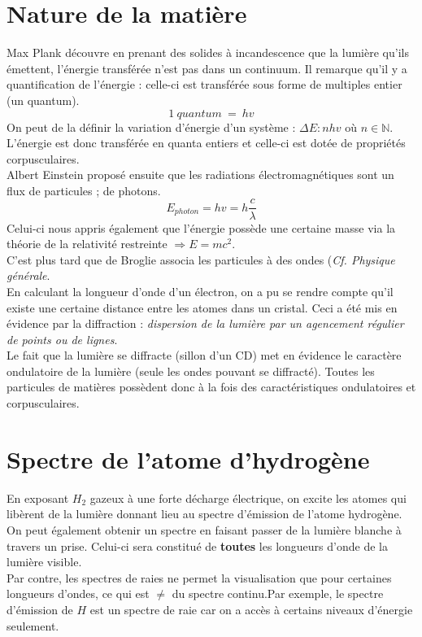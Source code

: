 \documentclass	[11pt, a4paper, openany]{book}
\begin{document}
\section{Nature de la matière}
Max Plank découvre en prenant des solides à incandescence que la lumière qu'ils émettent, l'énergie transférée n'est pas dans un continuum. Il remarque qu'il y a quantification de l'énergie : celle-ci est transférée sous forme de multiples entier (un quantum).
$$1\ quantum\ =\ hv$$
On peut de la définir la variation d'énergie d'un système : $\Delta E : n h v$ où $n \in \mathbb{N}$. L'énergie est donc transférée en quanta entiers et celle-ci est dotée de propriétés corpusculaires.\\

Albert Einstein proposé ensuite que les radiations électromagnétiques sont un flux de particules ; de photons.
$$E_{photon} = h v = h\frac{c}{\lambda}$$
Celui-ci nous appris également que l'énergie possède une certaine masse via la théorie de la relativité restreinte $\Rightarrow E = mc^2$.\\

C'est plus tard que de Broglie associa les particules à des ondes (\textit{Cf. Physique générale}.\\
En calculant la longueur d'onde d'un électron, on a pu se rendre compte qu'il existe une certaine distance entre les atomes dans un cristal. Ceci a été mis en évidence par la diffraction : \textit{dispersion de la lumière par un agencement régulier de points ou de lignes}.\\

Le fait que la lumière se diffracte (sillon d'un CD) met en évidence le caractère ondulatoire de la lumière (seule les ondes pouvant se diffracté). Toutes les particules de matières possèdent donc à la fois des caractéristiques ondulatoires et corpusculaires.

\section{Spectre de l'atome d'hydrogène}
En exposant $H_2$ gazeux à une forte décharge électrique, on excite les atomes qui libèrent de la lumière donnant lieu au spectre d'émission de l'atome hydrogène.
On peut également obtenir un spectre en faisant passer de la lumière blanche à travers un prise. Celui-ci sera constitué de \textbf{toutes} les longueurs d'onde de la lumière visible.\\

Par contre, les spectres de raies ne permet la visualisation que pour certaines longueurs d'ondes, ce qui est $\neq$ du spectre continu.Par exemple, le spectre d'émission de $H$ est un spectre de raie car on a accès à certains niveaux d'énergie seulement.
\end{document}
